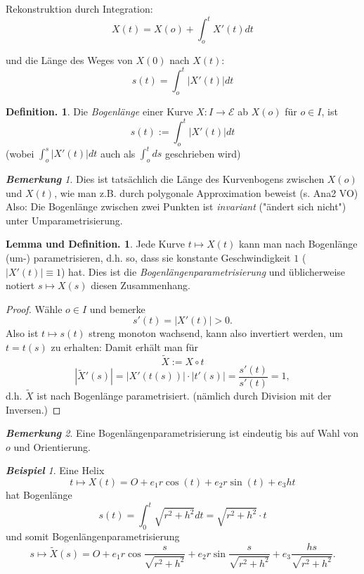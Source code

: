 \documentclass[a4paper,oneside,11pt,DIV=12,parskip=half]{scrartcl}
\theoremstyle{plain}
\theoremstyle{definition}
\newtheorem{definition}[theorem]{Definition.}
\newtheorem{remark, definition}[theorem]{Bemerkung und Definition.}
\newtheorem{lemma, definition}[theorem]{Lemma und Definition.}
\theoremstyle{remark}
\newtheorem*{remark}{\textbf{Bemerkung}}
\newtheorem*{example}{\textbf{Beispiel}}
\newtheorem*{remark, example}{\textbf{Bemerkung und Beispiel}}
\begin{document}
Rekonstruktion durch Integration:
\[X(t)= X(o) + \int_{o}^{t}X'(t)dt\]

und die Länge des Weges von $X(0)$ nach $X(t)$:
\[s(t) = \int_{o}^{t}|X'(t)|dt\]

\begin{definition}
	
	Die \emph{Bogenlänge} einer Kurve $X: I \rightarrow \mathcal{E}$ ab $X(o)$ für $o \in I$, ist
	\[s(t) := \int_{o}^{t}|X'(t)|dt\] (wobei $\int_{o}^{s}|X'(t)|dt$ auch als $\int_{o}^{t} ds$ geschrieben wird)
	
\end{definition}

\begin{remark}
	Dies ist tatsächlich die Länge des Kurvenbogens zwischen $X(o)$ und $X(t)$, wie man z.B. durch polygonale Approximation beweist (s. Ana2 VO)
	Also: Die Bogenlänge zwischen zwei Punkten ist \emph{invariant} ("ändert sich nicht")
	unter Umparametrisierung.
\end{remark}

\begin{lemma, definition}\label{umpar}
	Jede Kurve $t \mapsto X(t)$ kann man nach Bogenlänge (um-) parametrisieren, d.h. so, dass sie konstante Geschwindigkeit $1$ ($|X'(t)|\equiv 1$) hat.
	Dies ist die \emph{Bogenlängenparametrisierung} und üblicherweise notiert $s \mapsto X(s)$ diesen Zusammenhang.
\end{lemma, definition}
\begin{proof}
	Wähle $o \in I$ und bemerke \[s'(t) = |X'(t)| > 0.\]
	Also ist $t \mapsto s(t)$ streng monoton wachsend, kann also invertiert werden, um $t= t(s)$ zu erhalten: Damit erhält man für 
	\[\widetilde{X}:=X\circ t\]
	\[|\widetilde{X}'(s)|= |X'(t(s))| \cdot |t'(s)| = \frac{s'(t)}{s'(t)}= 1,\]
	d.h. $\widetilde{X}$ ist nach Bogenlänge parametrisiert. (nämlich durch Division mit der Inversen.)
\end{proof}

\begin{remark}
	Eine Bogenlängenparametrisierung ist eindeutig bis auf Wahl von $o$ und Orientierung.
\end{remark}

\begin{example}
	Eine Helix \[t \mapsto X(t) = O + e_1r\cos(t)+e_2r\sin(t)+ e_3ht\]
	hat Bogenlänge \[s(t) = \int_{0}^{t} \sqrt{r^2 + h^2}dt = \sqrt{r^2+h^2} \cdot t\]
	und somit Bogenlängenparametrisierung \[s \mapsto \widetilde{X}(s)= O + e_1r\cos\frac{s}{\sqrt{r^2+h^2}}+e_2r\sin\frac{s}{\sqrt{r^2+h^2}}+ e_3\frac{hs}{\sqrt{r^2+h^2}}.\]
\end{example}
\end{document}
